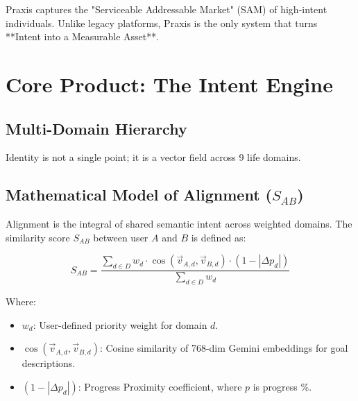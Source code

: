 \documentclass[11pt,a4paper,oneside]{article}
\begin{document}
\begin{marketbox}
Praxis captures the "Serviceable Addressable Market" (SAM) of high-intent individuals. Unlike legacy platforms, Praxis is the only system that turns **Intent into a Measurable Asset**.
\end{marketbox}

\section{Core Product: The Intent Engine}

\subsection{Multi-Domain Hierarchy}
Identity is not a single point; it is a vector field across 9 life domains. 

\begin{center}
\end{center}

\subsection{Mathematical Model of Alignment ($S_{AB}$)}
Alignment is the integral of shared semantic intent across weighted domains. The similarity score $S_{AB}$ between user $A$ and $B$ is defined as:

\begin{equation}
S_{AB} = \frac{\sum_{d \in D} w_d \cdot \cos(\vec{v}_{A,d}, \vec{v}_{B,d}) \cdot (1 - |\Delta p_d|)}{\sum_{d \in D} w_d}
\end{equation}

Where:
\begin{itemize}
    \item $w_d$: User-defined priority weight for domain $d$.
    \item $\cos(\vec{v}_{A,d}, \vec{v}_{B,d})$: Cosine similarity of 768-dim Gemini embeddings for goal descriptions.
    \item $(1 - |\Delta p_d|)$: Progress Proximity coefficient, where $p$ is progress \%.
\end{itemize}
\end{document}

